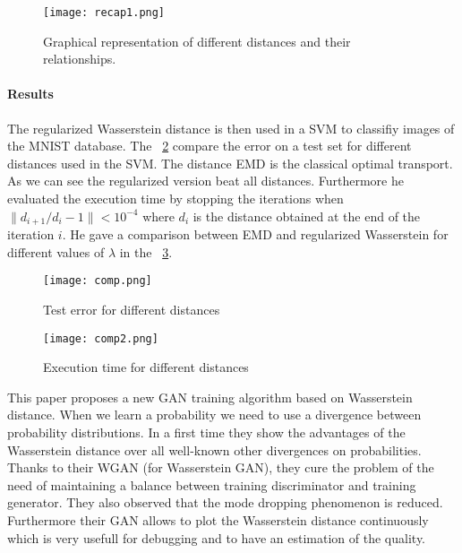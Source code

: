 \begin{figure}
	\centering
	\texttt{[image: recap1.png]}
	\captionsetup{justification=centering}
	\caption{Graphical representation of different distances and their relationships.}
	\label{recap1}
\end{figure}

\paragraph{Results}
The regularized Wasserstein distance is then used in a SVM to classifiy images of the MNIST database. The \figurename~\ref{comp} compare the error on a test set for different distances used in the SVM. The distance EMD is the classical optimal transport. As we can see the regularized version beat all distances. Furthermore he evaluated the execution time by stopping the iterations when $\| d_{i+1} / d_i - 1 \| < 10^{-4}$ where $d_i$ is the distance obtained at the end of the iteration $i$. He gave a comparison between EMD and regularized Wasserstein for different values of $\lambda$ in the \figurename~\ref{comp2}.

\begin{figure}[h]
	\centering
	\texttt{[image: comp.png]}
	\caption{Test error for different distances}
	\label{comp}
\end{figure}
\begin{figure}[h]
\centering
\texttt{[image: comp2.png]}
\caption{Execution time for different distances}
\label{comp2}
\end{figure}

\newpage


This paper proposes a new GAN training algorithm based on Wasserstein distance. When we learn a probability we need to use a divergence between probability distributions. In a first time they show the advantages of the Wasserstein distance over all well-known other divergences on probabilities. Thanks to their WGAN (for Wasserstein GAN), they cure the problem of the need of maintaining a balance between training discriminator and training generator. They also observed that the mode dropping phenomenon is reduced. Furthermore their GAN allows to plot the Wasserstein distance continuously which is very usefull for debugging and to have an estimation of the quality.

